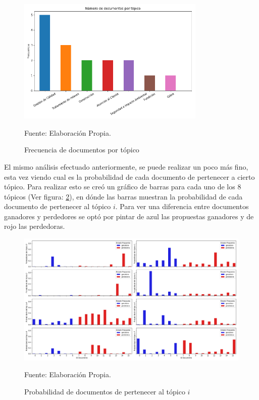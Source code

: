     \begin{figure}[H]
        \centering
        \includegraphics[width=0.8\textwidth]{figures/LDA/documents_per_topic.png}
        \caption{\label{fig:FreqperTopic} Frecuencia de documentos por tópico} Fuente: Elaboración Propia.
    \end{figure}
    
    El mismo análisis efectuado anteriormente, se puede realizar un poco más fino, esta vez viendo cual es la probabilidad de cada documento de pertenecer a cierto tópico. Para realizar esto se creó un gráfico de barras para cada uno de los 8 tópicos (Ver figura: \ref{fig:TopicPerDoc}), en dónde las barras muestran la probabilidad de cada documento de pertenecer al tópico $i$. Para ver una diferencia entre documentos ganadores y perdedores se optó por pintar de azul las propuestas ganadores y de rojo las perdedoras.
    
    \begin{figure}[h!]
        \centering
        \includegraphics[width=1\textwidth]{figures/LDA/distribution.png}
        \caption{\label{fig:TopicPerDoc} Probabilidad de documentos de pertenecer al tópico $i$} Fuente: Elaboración Propia.
    \end{figure}
    
